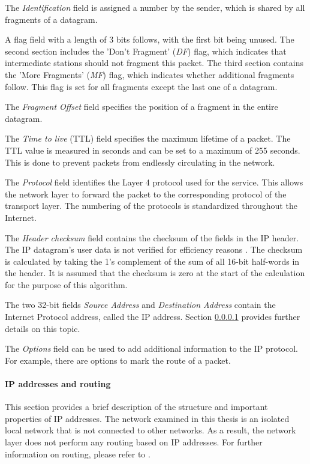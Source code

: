 The \textit{Identification} field is assigned a number by the sender, which is shared by all fragments of a datagram.

A flag field with a length of 3 bits follows, with the first bit being unused. The second section includes the 'Don't Fragment' (\textit{DF}) flag, which indicates that intermediate stations should not fragment this packet. The third section contains the 'More Fragments' (\textit{MF}) flag, which indicates whether additional fragments follow. This flag is set for all fragments except the last one of a datagram.

The \textit{Fragment Offset} field specifies the position of a fragment in the entire datagram.

The \textit{Time to live} (TTL) field specifies the maximum lifetime of a packet. The TTL value is measured in seconds and can be set to a maximum of 255 seconds. This is done to prevent packets from endlessly circulating in the network.

The \textit{Protocol} field identifies the Layer 4 protocol used for the service. This allows the network layer to forward the packet to the corresponding protocol of the transport layer. The numbering of the protocols is standardized throughout the Internet.

The \textit{Header checksum} field contains the checksum of the fields in the IP header. The IP datagram's user data is not verified for efficiency reasons \cite{Holtkamp2024Internet}. The checksum is calculated by taking the 1's complement of the sum of all 16-bit half-words in the header. It is assumed that the checksum is zero at the start of the calculation for the purpose of this algorithm.

The two 32-bit fields \textit{Source Address} and \textit{Destination Address} contain the Internet Protocol address, called the IP address. Section \ref{chap:IPandRouting} provides further details on this topic.

The \textit{Options} field can be used to add additional information to the IP protocol. For example, there are options to mark the route of a packet.


\paragraph{IP addresses and routing} \label{chap:IPandRouting}

This section provides a brief description of the structure and important properties of IP addresses. The network examined in this thesis is an isolated local network that is not connected to other networks. As a result, the network layer does not perform any routing based on IP addresses. For further information on routing, please refer to \cite{Tanenbaum2010}.

